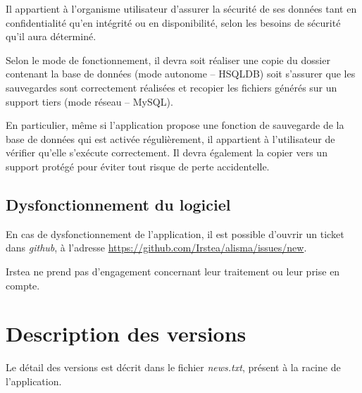 Il appartient à l'organisme utilisateur d'assurer la sécurité de ses données tant en confidentialité qu'en intégrité ou en disponibilité, selon les besoins de sécurité qu'il aura déterminé. 

Selon le mode de fonctionnement, il devra soit réaliser une copie du dossier contenant la base de données (mode autonome -- HSQLDB) soit s'assurer que les sauvegardes sont correctement réalisées et recopier les fichiers générés sur un support tiers (mode réseau -- MySQL).

En particulier, même si l'application propose une fonction de sauvegarde de la base de données qui est activée régulièrement, il appartient à l'utilisateur de vérifier qu'elle s'exécute correctement. Il devra également la copier vers un support protégé pour éviter tout risque de perte accidentelle.

\subsection{Dysfonctionnement du logiciel}

En cas de dysfonctionnement de l'application, il est possible d'ouvrir un ticket dans \textit{github}, à l'adresse \url{https://github.com/Irstea/alisma/issues/new}.

Irstea ne prend pas d'engagement concernant leur traitement ou leur prise en compte.

\section{Description des versions}
Le détail des versions est décrit dans le fichier \textit{news.txt}, présent à la racine de l'application.
